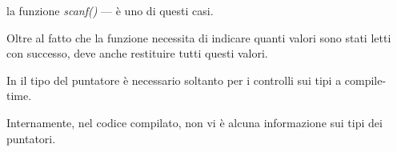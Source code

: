 la funzione \emph{scanf()} --- è uno di questi casi.

Oltre al fatto che la funzione necessita di indicare quanti valori sono stati letti con successo, deve anche restituire tutti questi valori.

In \CCpp il tipo del puntatore è necessario soltanto per i controlli sui tipi a compile-time.

Internamente, nel codice compilato, non vi è alcuna informazione sui tipi dei puntatori.






